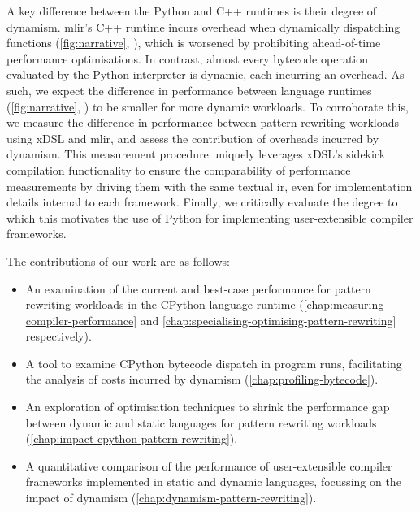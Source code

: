 

A key difference between the Python and C++ runtimes is their degree of dynamism.
\ac{mlir}'s C++ runtime incurs overhead when dynamically dispatching functions (\autoref{fig:narrative}, ), which is worsened by prohibiting ahead-of-time performance optimisations. In contrast, almost every bytecode operation evaluated by the Python interpreter is dynamic, each incurring an overhead.
As such, we expect the difference in performance between language runtimes (\autoref{fig:narrative}, ) to be smaller for more dynamic workloads.
To corroborate this, we measure the difference in performance between pattern rewriting workloads using xDSL and \ac{mlir}, and assess the contribution of overheads incurred by dynamism.
This measurement procedure uniquely leverages xDSL's sidekick compilation functionality to ensure the comparability of performance measurements by driving them with the same textual \ac{ir}, even for implementation details internal to each framework.
Finally, we critically evaluate the degree to which this motivates the use of Python for implementing user-extensible compiler frameworks.



The contributions of our work are as follows:

\begin{itemize}
    \item An examination of the current and best-case performance for pattern rewriting workloads in the CPython language runtime (\autoref{chap:measuring-compiler-performance} and \autoref{chap:specialising-optimising-pattern-rewriting} respectively). %
    \item A tool to examine CPython bytecode dispatch in program runs, facilitating the analysis of costs incurred by dynamism (\autoref{chap:profiling-bytecode}).
    \item An exploration of optimisation techniques to shrink the performance gap between dynamic and static languages for pattern rewriting workloads (\autoref{chap:impact-cpython-pattern-rewriting}).
    \item A quantitative comparison of the performance of user-extensible compiler frameworks implemented in static and dynamic languages, focussing on the impact of dynamism (\autoref{chap:dynamism-pattern-rewriting}). %
\end{itemize}
